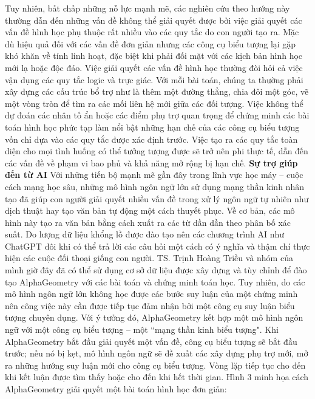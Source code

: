 \begin{multicols}{2}
	\vskip 0.1cm
	Tuy nhiên, bất chấp những nỗ lực mạnh mẽ, các nghiên cứu theo hướng này thường dẫn đến những vấn đề không thể giải quyết được bởi việc giải quyết các vấn đề hình học phụ thuộc rất nhiều vào các quy tắc do con người tạo ra. Mặc dù hiệu quả đối với các vấn đề đơn giản nhưng các công cụ biểu tượng lại gặp khó khăn về tính linh hoạt, đặc biệt khi phải đối mặt với các kịch bản hình học mới lạ hoặc độc đáo. 
	\vskip 0.2cm
	Việc giải quyết các vấn đề hình học thường đòi hỏi cả việc vận dụng các quy tắc logic và trực giác. Với mỗi bài toán, chúng ta thường phải xây dựng các cấu trúc bổ trợ như là thêm một đường thẳng, chia đôi một góc, vẽ một vòng tròn để tìm ra các mối liên hệ mới giữa các đối tượng. Việc không thể dự đoán các nhân tố ẩn hoặc các điểm phụ trợ quan trọng để chứng minh các bài toán hình học phức tạp làm nổi bật những hạn chế của các công cụ biểu tượng vốn chỉ dựa vào các quy tắc được xác định trước. Việc tạo ra các quy tắc toàn diện cho mọi tình huống có thể tưởng tượng được sẽ trở nên phi thực tế, dẫn đến các vấn đề về phạm vi bao phủ và khả năng mở rộng bị hạn chế.
	\vskip 0.2cm
	\textbf{\color{timhieukhoahoc}Sự trợ giúp đến từ AI}
	\vskip 0.2cm
	Với những tiến bộ mạnh mẽ gần đây trong lĩnh vực học máy -- cuộc cách mạng học sâu, những mô hình ngôn ngữ lớn sử dụng mạng thần kinh nhân tạo đã giúp con người giải quyết nhiều vấn đề trong xử lý ngôn ngữ tự nhiên như dịch thuật hay tạo văn bản tự động một cách thuyết phục. Về cơ bản, các mô hình này tạo ra văn bản bằng cách xuất ra các từ dần dần theo phân bố xác suất. Do lượng dữ liệu khổng lồ được đào tạo nên các chương trình AI như ChatGPT đôi khi có thể trả lời các câu hỏi một cách có ý nghĩa và thậm chí thực hiện các cuộc đối thoại giống con người. TS. Trịnh Hoàng Triều và nhóm của mình giờ đây đã có thể sử dụng cơ sở dữ liệu được xây dựng và tùy chỉnh để đào tạo AlphaGeometry với các bài toán và chứng minh toán học. 
	\vskip 0.1cm
	Tuy nhiên, do các mô hình ngôn ngữ lớn không học được các bước suy luận của một chứng minh nên công việc này cần được tiếp tục đảm nhận bởi một công cụ suy luận biểu tượng chuyên dụng. Với ý tưởng đó, AlphaGeometry kết hợp một mô hình ngôn ngữ với một công cụ biểu tượng -- một ``mạng thần kinh biểu tượng".
	\vskip 0.1cm
	Khi AlphaGeometry bắt đầu giải quyết một vấn đề, công cụ biểu tượng sẽ bắt đầu trước; nếu nó bị kẹt, mô hình ngôn ngữ sẽ đề xuất các xây dựng phụ trợ mới, mở ra những hướng suy luận mới cho công cụ biểu tượng. Vòng lặp tiếp tục cho đến khi kết luận được tìm thấy hoặc cho đến khi hết thời gian.
	\vskip 0.1cm
	Hình $3$ minh họa cách AlphaGeometry giải quyết một bài toán hình học đơn giản:

\end{multicols}
